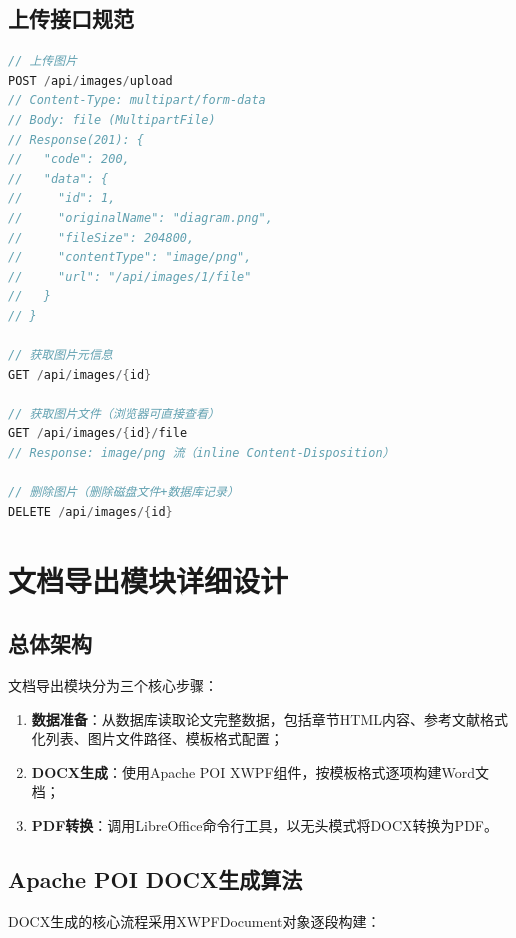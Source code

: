 \documentclass{../softeng}
\begin{document}
\subsection{上传接口规范}

\begin{lstlisting}[language=Java,caption={ImageController 上传与访问接口}]
// 上传图片
POST /api/images/upload
// Content-Type: multipart/form-data
// Body: file (MultipartFile)
// Response(201): {
//   "code": 200,
//   "data": {
//     "id": 1,
//     "originalName": "diagram.png",
//     "fileSize": 204800,
//     "contentType": "image/png",
//     "url": "/api/images/1/file"
//   }
// }

// 获取图片元信息
GET /api/images/{id}

// 获取图片文件（浏览器可直接查看）
GET /api/images/{id}/file
// Response: image/png 流（inline Content-Disposition）

// 删除图片（删除磁盘文件+数据库记录）
DELETE /api/images/{id}
\end{lstlisting}

\section{文档导出模块详细设计}

\subsection{总体架构}

文档导出模块分为三个核心步骤：
\begin{enumerate}
    \item \textbf{数据准备}：从数据库读取论文完整数据，包括章节HTML内容、参考文献格式化列表、图片文件路径、模板格式配置；
    \item \textbf{DOCX生成}：使用Apache POI XWPF组件，按模板格式逐项构建Word文档；
    \item \textbf{PDF转换}：调用LibreOffice命令行工具，以无头模式将DOCX转换为PDF。
\end{enumerate}

\subsection{Apache POI DOCX生成算法}

DOCX生成的核心流程采用XWPFDocument对象逐段构建：
\end{document}
